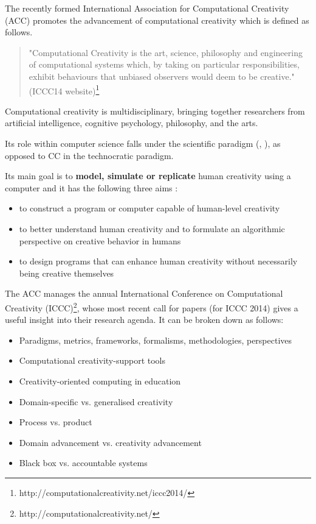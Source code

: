The recently formed International Association for Computational Creativity (ACC)  promotes the advancement of computational creativity which is defined as follows.

\begin{quote}
"Computational Creativity is the art, science, philosophy and engineering of computational systems which, by taking on particular responsibilities, exhibit behaviours that unbiased observers would deem to be creative." (ICCC14 website)\footnote{http://computationalcreativity.net/iccc2014/}
\end{quote}

Computational creativity is multidisciplinary, bringing together researchers from artificial intelligence, cognitive psychology, philosophy, and the arts.

\begin{draft}
Its role within computer science falls under the scientific paradigm (\citep[p.8]{Hugill2013c}, \citep[see also]{Eden2007}), as opposed to CC in the technocratic paradigm.
\end{draft}

Its main goal is to \textbf{model, simulate or replicate} human creativity using a computer and it has the following three aims :

\begin{itemize}
\item to construct a program or computer capable of human-level creativity
\item to better understand human creativity and to formulate an algorithmic perspective on creative behavior in humans
\item to design programs that can enhance human creativity without necessarily being creative themselves
\end{itemize}

The ACC manages the annual International Conference on Computational Creativity (ICCC)\footnote{http://computationalcreativity.net/}, whose most recent call for papers  (for ICCC 2014) gives a useful insight into their research agenda. It can be broken down as follows:

\begin{itemize}
\item Paradigms, metrics, frameworks, formalisms, methodologies, perspectives
\item Computational creativity-support tools
\item Creativity-oriented computing in education
\item Domain-specific vs. generalised creativity
\item Process vs. product
\item Domain advancement vs. creativity advancement
\item Black box vs. accountable systems
\end{itemize}

